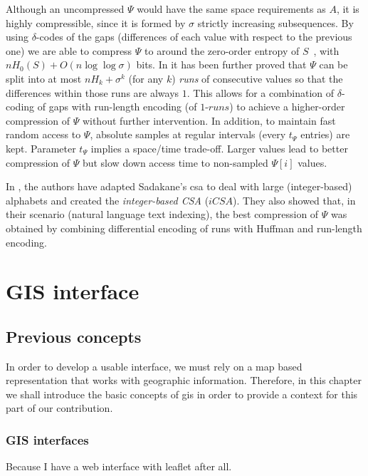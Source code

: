 \documentclass[a4paper,10pt,twoside]{book}
\begin{document}
    Although an uncompressed $\Psi$ would have the same space requirements
    as $A$, it is highly compressible, since it is formed by $\sigma$ strictly increasing subsequences. By using $\delta$-codes of the gaps (differences of each value with respect to the previous one) we are able to compress $\Psi$ to around the zero-order entropy of $S$~\cite{Sad03}, with $nH_0(S)+O(n\log\log\sigma)$ bits.
    In \cite{NM07} it has been further proved that $\Psi$ can be split into
    at most $nH_k+\sigma^k$ (for any $k$) {\em runs} of consecutive values so
    that the differences within those runs are always $1$. This allows for a combination of $\delta$-coding of gaps with run-length
    encoding (of $1$-$runs$) to achieve a higher-order compression of $\Psi$ without further intervention.
    In addition, to maintain fast random access to $\Psi$, absolute
    samples at regular intervals (every $t_{\Psi}$ entries) are kept. Parameter
    $t_{\Psi}$ implies a space/time trade-off. Larger values lead to better compression of $\Psi$ but slow down access time to non-sampled $\Psi[i]$ values.
    
    In \cite{FBNCPR12}, the authors have adapted Sadakane's \gls{csa} to deal with large (integer-based) alphabets
    and created the {\em integer-based CSA} ($iCSA$). They also showed that, in their scenario (natural language text indexing), the best
    compression of $\Psi$ was obtained by combining differential encoding of runs with Huffman and
    run-length encoding.


	

	
\part{GIS interface}
\chapter{Previous concepts}
    In order to develop a usable interface, we must rely on a map based representation that works with geographic information. Therefore, in this chapter we shall introduce the basic concepts of \gls{gis} in order to provide a context for this part of our contribution.

    \section{GIS interfaces}
	Because I have a web interface with leaflet after all.
\end{document}

